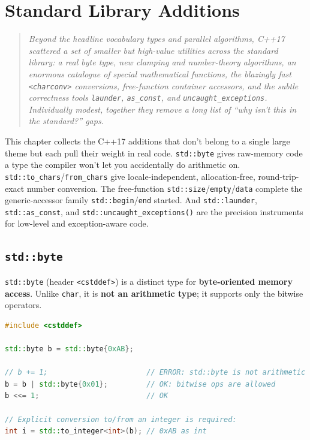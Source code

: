 \chapter{Standard Library Additions}
\label{ch:c17-stdlib-additions}

\begin{quote}
\emph{Beyond the headline vocabulary types and parallel algorithms, C++17 scattered a set of smaller but high-value utilities across the standard library: a real byte type, new clamping and number-theory algorithms, an enormous catalogue of special mathematical functions, the blazingly fast \texttt{<charconv>} conversions, free-function container accessors, and the subtle correctness tools \texttt{launder}, \texttt{as\_const}, and \texttt{uncaught\_exceptions}. Individually modest, together they remove a long list of ``why isn't this in the standard?'' gaps.}
\end{quote}

This chapter collects the C++17 additions that don't belong to a single large theme but each pull their weight in real code. \texttt{std::byte} gives raw-memory code a type the compiler won't let you accidentally do arithmetic on. \texttt{std::to\_chars}/\texttt{from\_chars} give locale-independent, allocation-free, round-trip-exact number conversion. The free-function \texttt{std::size}/\texttt{empty}/\texttt{data} complete the generic-accessor family \texttt{std::begin}/\texttt{end} started. And \texttt{std::launder}, \texttt{std::as\_const}, and \texttt{std::uncaught\_exceptions()} are the precision instruments for low-level and exception-aware code.

\section{\texttt{std::byte}}
\label{sec:c17-byte}

\texttt{std::byte} (header \texttt{<cstddef>}) is a distinct type for \textbf{byte-oriented memory access}. Unlike \texttt{char}, it is \textbf{not an arithmetic type}; it supports only the bitwise operators.

\begin{lstlisting}[language=C++,caption={std::byte models raw memory, not a number}]
#include <cstddef>

std::byte b = std::byte{0xAB};

// b += 1;                       // ERROR: std::byte is not arithmetic
b = b | std::byte{0x01};         // OK: bitwise ops are allowed
b <<= 1;                         // OK

// Explicit conversion to/from an integer is required:
int i = std::to_integer<int>(b); // 0xAB as int
\end{lstlisting}

